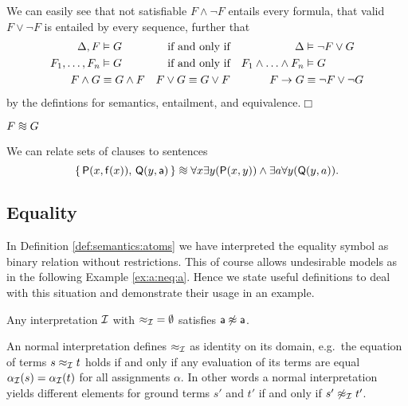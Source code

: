 \begin{lemma}
	We can easily see that not satisfiable $F\land\lnot F$ entails every formula,
	that valid $F\lor\lnot F$ is entailed by every sequence, further that
	\begin{align*}
	\Delta, F&\vDash G  &\text{if and only if} && \Delta &\vDash \lnot F\lor G \\
	F_1,\ldots,F_n&\vDash G  &\text{if and only if} && F_1\land\ldots\land F_n&\vDash G\\
	F\land G&\equiv G\land F &F\lor G\equiv G\lor F && F\rightarrow G &\equiv \lnot F\lor \lnot G
	\end{align*}
	by the defintions for semantics, entailment, and equivalence.\hfill$\Box$
\end{lemma}


\begin{definition}[Equisatisfiability] $F \equisat G$
\end{definition}


\begin{example}We can relate sets of clauses to sentences
	\[
	\{\,\mP(x, \mf(x)),\,\mQ(y,\ma)\,\} \equisat \forall x\exists y(\mP(x,y)) \land \exists a\forall y(\mQ(y,a)) .
	\]
\end{example}



\subsection{Equality}

In Definition \ref{def:semantics:atoms} we have interpreted the equality symbol as binary relation without restrictions.
This of course allows undesirable models as in the following Example \ref{ex:a:neq:a}.
Hence we state useful definitions to deal with this situation and demonstrate their usage in an example.

\begin{example}
	\label{ex:a:neq:a}
	Any interpretation $\mathcal{I}$
	with ${\approx_{\mathcal{I}}} = \emptyset$ satisfies $\mathsf{a}\not\approx\mathsf{a}$.
\end{example}

\begin{definition}\label{def:normal:interpreation}
	An {\myem normal} interpretation defines $\approx_{\mathcal{I}}$ as identity on its domain,
	e.g.~the equation of terms $s \approx_{\mathcal{I}} t$ holds if and only
	if any evaluation of its terms are equal $\alpha_{\mathcal{I}}(s) = \alpha_{\mathcal{I}}(t)$
	for all assignments $\alpha$.
	In other words a normal interpretation yields different elements
	for ground terms $s'$ and $t'$ if and only if $s'\not\approx_{\mathcal{I}} t'$.
\end{definition}

